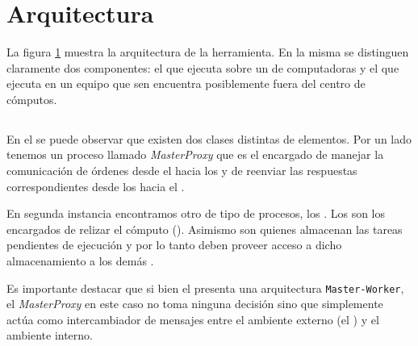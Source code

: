 
\section{Arquitectura}

\begin{figure}
\label{fig:arquitectura}
\end{figure}


La figura \ref{fig:arquitectura} muestra la arquitectura de la herramienta. En
la misma se distinguen claramente dos componentes: el \bend que ejecuta sobre
un \cluster de computadoras y el \fend que ejecuta en un equipo que sen
encuentra posiblemente fuera del centro de cómputos.

\subsection{\bend}

\newcommand{\master}{\emph{MasterProxy}\xspace}

En el \bend se puede observar que existen dos clases distintas de elementos.
Por un lado tenemos un proceso llamado \master que es el encargado de manejar
la comunicación de órdenes desde el \fend hacia los \ws y de reenviar las
respuestas correspondientes desde los \ws hacia el \fend.

En segunda instancia encontramos otro de tipo de procesos, los \ws. Los \ws
son los encargados de relizar el cómputo (\ssolving). Asimismo son quienes
almacenan las tareas pendientes de ejecución y por lo tanto deben proveer
acceso a dicho almacenamiento a los demás \ws.

\newcommand{\masterslave}{\texttt{Master-Worker}\xspace}

Es importante destacar que si bien el \bend presenta una arquitectura
\masterslave, el \master en este caso no toma ninguna decisión sino que
simplemente actúa como intercambiador de mensajes entre el ambiente externo
(el \fend) y el ambiente interno.

\subsection{\fend}

